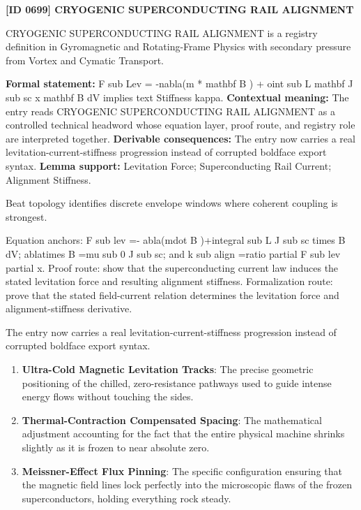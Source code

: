 \clearpage
\noindent\textbf{[ID 0699] CRYOGENIC SUPERCONDUCTING RAIL ALIGNMENT}\par
\vspace{0.35em}
\begingroup\small
{}
CRYOGENIC SUPERCONDUCTING RAIL ALIGNMENT is a registry definition in Gyromagnetic and Rotating-Frame Physics with secondary pressure from Vortex and Cymatic Transport.

\begingroup\footnotesize\setlength{\emergencystretch}{3em}\sloppy
\textbf{Formal statement:} F sub Lev = -nabla(m * mathbf B ) + oint sub L mathbf J sub sc x mathbf B dV implies text Stiffness kappa. \textbf{Contextual meaning:} The entry reads CRYOGENIC SUPERCONDUCTING RAIL ALIGNMENT as a controlled technical headword whose equation layer, proof route, and registry role are interpreted together. \textbf{Derivable consequences:} The entry now carries a real levitation-current-stiffness progression instead of corrupted boldface export syntax. \textbf{Lemma support:} Levitation Force; Superconducting Rail Current; Alignment Stiffness.\par
\endgroup

Beat topology identifies discrete envelope windows where coherent coupling is strongest.

Equation anchors: F sub lev =- abla(mdot B )+integral sub L J sub sc times B dV; ablatimes B =mu sub 0 J sub sc; and k sub align =ratio partial F sub lev partial x. Proof route: show that the superconducting current law induces the stated levitation force and resulting alignment stiffness. Formalization route: prove that the stated field-current relation determines the levitation force and alignment-stiffness derivative.

The entry now carries a real levitation-current-stiffness progression instead of corrupted boldface export syntax.
\endgroup

\begin{enumerate}[leftmargin=1.6em,itemsep=6pt,topsep=4pt]
\item \textbf{Ultra-Cold Magnetic Levitation Tracks}: The precise geometric positioning of the chilled, zero-resistance pathways used to guide intense energy flows without touching the sides.
\item \textbf{Thermal-Contraction Compensated Spacing}: The mathematical adjustment accounting for the fact that the entire physical machine shrinks slightly as it is frozen to near absolute zero.
\item \textbf{Meissner-Effect Flux Pinning}: The specific configuration ensuring that the magnetic field lines lock perfectly into the microscopic flaws of the frozen superconductors, holding everything rock steady.
\end{enumerate}

